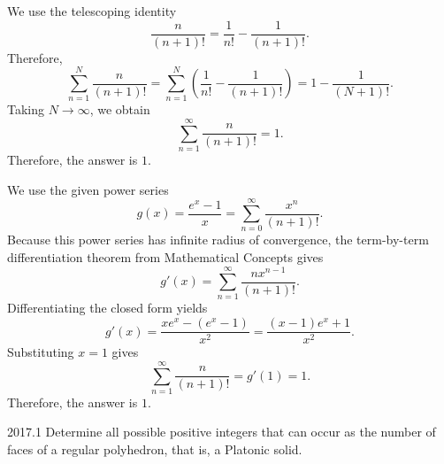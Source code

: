     \begin{solutions}
        \begin{solution}
            We use the telescoping identity
            \[
                \frac{n}{(n+1)!}
                =
                \frac{1}{n!}-\frac{1}{(n+1)!}.
            \]
            Therefore,
            \[
                \sum_{n=1}^{N}\frac{n}{(n+1)!}
                =
                \sum_{n=1}^{N}
                \left(
                    \frac{1}{n!}-\frac{1}{(n+1)!}
                \right)
                =
                1-\frac{1}{(N+1)!}.
            \]
            Taking $N\to\infty$, we obtain
            \[
                \sum_{n=1}^{\infty}\frac{n}{(n+1)!}
                =
                1.
            \]
            Therefore, the answer is $\boxed{1}$.
        \end{solution}

        \begin{solution}
            We use the given power series
            \[
                g(x)
                =
                \frac{e^x-1}{x}
                =
                \sum_{n=0}^{\infty}\frac{x^n}{(n+1)!}.
            \]
            Because this power series has infinite radius of convergence, the
            term-by-term differentiation theorem from Mathematical Concepts gives
            \[
                g'(x)
                =
                \sum_{n=1}^{\infty}\frac{n x^{n-1}}{(n+1)!}.
            \]
            Differentiating the closed form yields
            \[
                g'(x)
                =
                \frac{x e^x-(e^x-1)}{x^2}
                =
                \frac{(x-1)e^x+1}{x^2}.
            \]
            Substituting $x=1$ gives
            \[
                \sum_{n=1}^{\infty}\frac{n}{(n+1)!}
                =
                g'(1)
                =
                1.
            \]
            Therefore, the answer is $\boxed{1}$.
        \end{solution}
    \end{solutions}

    \begin{pastproblem}{2017.1}
        Determine all possible positive integers that can occur as the number of faces of a regular
        polyhedron, that is, a Platonic solid.
    \end{pastproblem}

